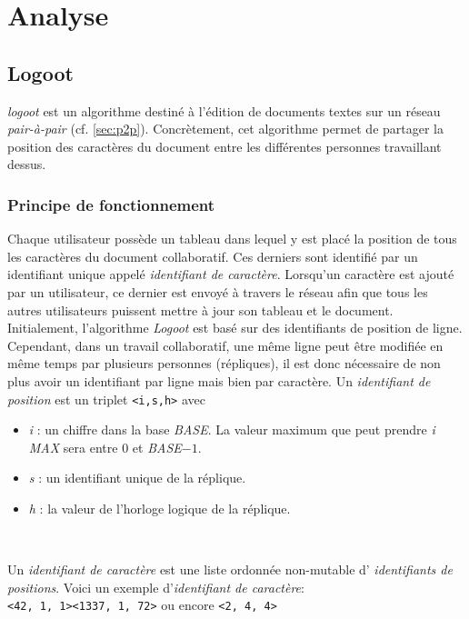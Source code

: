\chapter{Analyse}

\section{Logoot}
	\emph{logoot} est un algorithme destiné à l'édition de documents textes sur
	un réseau \emph{pair-à-pair} (cf. \ref{sec:p2p}). Concrètement, cet
	algorithme permet de partager la position des caractères du document entre
	les différentes personnes travaillant dessus.
	
	\subsection{Principe de fonctionnement}
		Chaque utilisateur possède un tableau dans lequel y est placé la
		position de tous les caractères du document collaboratif. Ces derniers
		sont identifié par un identifiant unique appelé \emph{identifiant de
		caractère}. Lorsqu'un caractère est ajouté par un utilisateur, ce
		dernier est envoyé à travers le réseau afin que tous les autres
		utilisateurs puissent mettre à jour	son	tableau et le document.\\
		
		Initialement, l'algorithme \emph{Logoot} est basé sur des identifiants
		de position de ligne. Cependant, dans un travail collaboratif, une même
		ligne peut être modifiée en même temps par plusieurs personnes
		(répliques), il est	donc nécessaire de non plus avoir un identifiant par
		ligne mais bien par caractère. Un \emph{identifiant de position} est
		un triplet
		\verb+<i,s,h>+ avec 
		\begin{itemize}
			\item \emph{i} : un chiffre dans la base \emph{BASE}. La valeur
			maximum que peut prendre \emph{i} \emph{MAX} sera entre $0$ et
			\emph{BASE}$ - 1$.
			\item \emph{s} : un identifiant unique de la réplique.
			\item \emph{h} : la valeur de l'horloge logique de la réplique.
		\end{itemize}~
		
		Un \emph{identifiant de caractère} est une liste ordonnée non-mutable d'
		\emph{identifiants de positions}. Voici un exemple d'\emph{identifiant
		de caractère}: \\
		\verb+<42, 1, 1><1337, 1, 72>+ ou encore \verb+<2, 4, 4>+\\
		
